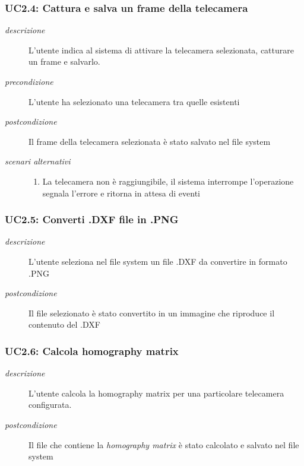 \subsubsection{UC2.4: Cattura e salva un frame della telecamera} \label{sec:uc2.4}
 \begin{description}
 \item[\em{descrizione}] L'utente indica al sistema di attivare la telecamera selezionata, catturare un frame e salvarlo.
  
  \item[\em{precondizione}] L'utente ha selezionato una telecamera tra quelle esistenti
  
  \item[\em{postcondizione}] Il frame della telecamera selezionata è stato salvato nel file system
  
\item[\em{scenari alternativi}]  \mbox{}
    \begin{enumerate} 
  \item La telecamera non è raggiungibile, il sistema interrompe l'operazione segnala l'errore e ritorna in attesa di eventi
  \end{enumerate}   
 \end{description}
 
 \subsubsection{UC2.5: Converti .DXF file in .PNG} \label{sec:uc2.5}
 \begin{description}
 \item[\em{descrizione}] L'utente seleziona nel file system un file .DXF da convertire in formato .PNG 
    
  \item[\em{postcondizione}] Il file selezionato è stato convertito in un immagine che riproduce il contenuto del .DXF
  
 \end{description}
 
 \subsubsection{UC2.6: Calcola homography matrix} \label{sec:uc2.6}
 \begin{description}
 \item[\em{descrizione}] L'utente calcola la homography matrix per una particolare telecamera configurata.
  \item[\em{postcondizione}] Il file che contiene la \textit{homography matrix} è stato calcolato e salvato nel file system
  
 \end{description}
 
